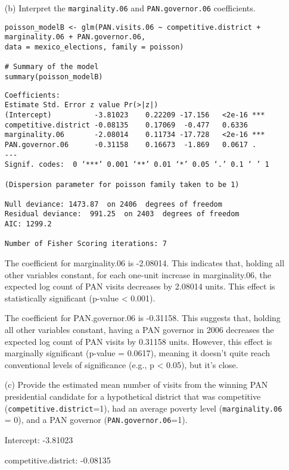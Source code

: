 \documentclass[12pt,letterpaper]{article}
\begin{document}
\begin{enumerate}
	\item [(b)]
	Interpret the \texttt{marginality.06} and \texttt{PAN.governor.06} coefficients.
	
\begin{lstlisting}
poisson_modelB <- glm(PAN.visits.06 ~ competitive.district + marginality.06 + PAN.governor.06, 
data = mexico_elections, family = poisson)

# Summary of the model
summary(poisson_modelB)
\end{lstlisting}

\begin{verbatim}
Coefficients:
Estimate Std. Error z value Pr(>|z|)    
(Intercept)          -3.81023    0.22209 -17.156   <2e-16 ***
competitive.district -0.08135    0.17069  -0.477   0.6336    
marginality.06       -2.08014    0.11734 -17.728   <2e-16 ***
PAN.governor.06      -0.31158    0.16673  -1.869   0.0617 .  
---
Signif. codes:  0 ‘***’ 0.001 ‘**’ 0.01 ‘*’ 0.05 ‘.’ 0.1 ‘ ’ 1

(Dispersion parameter for poisson family taken to be 1)

Null deviance: 1473.87  on 2406  degrees of freedom
Residual deviance:  991.25  on 2403  degrees of freedom
AIC: 1299.2

Number of Fisher Scoring iterations: 7	
\end{verbatim}
	
The coefficient for marginality.06 is -2.08014. This indicates that, holding all other variables constant, for each one-unit increase in marginality.06, the expected log count of PAN visits decreases by 2.08014 units. This effect is statistically significant (p-value < 0.001).

The coefficient for PAN.governor.06 is -0.31158. This suggests that, holding all other variables constant, having a PAN governor in 2006 decreases the expected log count of PAN visits by 0.31158 units. However, this effect is marginally significant (p-value = 0.0617), meaning it doesn't quite reach conventional levels of significance (e.g., p < 0.05), but it's close.
	
	\item [(c)]
	Provide the estimated mean number of visits from the winning PAN presidential candidate for a hypothetical district that was competitive (\texttt{competitive.district}=1), had an average poverty level (\texttt{marginality.06} = 0), and a PAN governor (\texttt{PAN.governor.06}=1).

Intercept: -3.81023

competitive.district: -0.08135


\end{enumerate}
\end{document}
